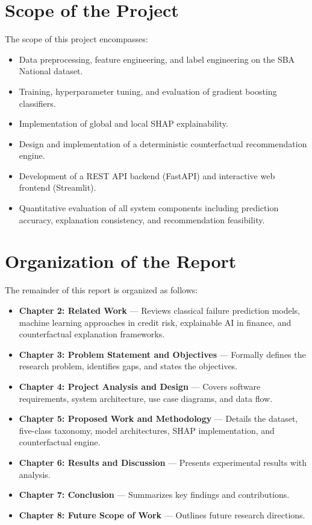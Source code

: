 \documentclass[12pt,a4paper]{report}
\begin{document}
\section{Scope of the Project}

The scope of this project encompasses:
\begin{itemize}
    \item Data preprocessing, feature engineering, and label engineering on the SBA National dataset.
    \item Training, hyperparameter tuning, and evaluation of gradient boosting classifiers.
    \item Implementation of global and local SHAP explainability.
    \item Design and implementation of a deterministic counterfactual recommendation engine.
    \item Development of a REST API backend (FastAPI) and interactive web frontend (Streamlit).
    \item Quantitative evaluation of all system components including prediction accuracy, explanation consistency, and recommendation feasibility.
\end{itemize}

\section{Organization of the Report}

The remainder of this report is organized as follows:
\begin{itemize}
    \item \textbf{Chapter 2: Related Work} --- Reviews classical failure prediction models, machine learning approaches in credit risk, explainable AI in finance, and counterfactual explanation frameworks.
    \item \textbf{Chapter 3: Problem Statement and Objectives} --- Formally defines the research problem, identifies gaps, and states the objectives.
    \item \textbf{Chapter 4: Project Analysis and Design} --- Covers software requirements, system architecture, use case diagrams, and data flow.
    \item \textbf{Chapter 5: Proposed Work and Methodology} --- Details the dataset, five-class taxonomy, model architectures, SHAP implementation, and counterfactual engine.
    \item \textbf{Chapter 6: Results and Discussion} --- Presents experimental results with analysis.
    \item \textbf{Chapter 7: Conclusion} --- Summarizes key findings and contributions.
    \item \textbf{Chapter 8: Future Scope of Work} --- Outlines future research directions.
\end{itemize}
\end{document}
